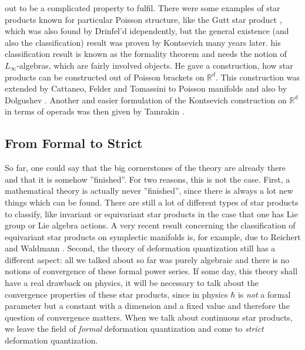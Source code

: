out to be a complicated property to fulfil. There were some examples of star 
products known for particular Poisson structure, like the Gutt star product 
\cite{gutt:1983a}, which was also found by Drinfel'd \cite{drinfeld:1983a} 
idependently, but the general existence (and also the classification) result was 
proven by Kontsevich \cite{kontsevich:1997:pre, kontsevich:2003a} many years 
later. his classification result is known as the formality theorem and needs the 
notion of $L_{\infty}$-algebras, which are fairly involved objects. He gave a 
construction, how star products can be constructed out of Poisson brackets on 
$\mathbb{R}^d$. This construction was extended by Cattaneo, Felder and Tomassini 
to Poisson manifolds \cite{cattaneo.felder.tomassini:2002b} and also by 
Dolgushev \cite{dolgushev:2005a}. Another and easier formulation of the 
Kontsevich construction on $\mathbb{R}^d$ in terms of operads was then given by 
Tamrakin \cite{tamarkin:2003a}.



\subsection{From Formal to Strict}
\label{subsec:chap2_Formal2Strict}

So far, one could say that the big cornerstones of the theory are already there 
and that it is somehow ''finished''. For two reasons, this is not the case. 
First, a mathematical theory is actually never ''finished'', since there is 
always a lot new things which can be found. There are still a lot of different 
types of star products to classify, like invariant or equivariant star products 
in the case that one has Lie group or Lie algebra actions. A very recent result 
concerning the classification of equivariant star products on symplectic 
manifolds is, for example, due to Reichert and Waldmann 
\cite{reichert.waldmann:2015a:pre}. Second, the theory of deformation 
quantization still has a different aspect: all we talked about so far was purely 
algebraic and there is no notions of convergence of these formal power series. 
If some day, this theory shall have a real drawback on physics, it will be 
necessary to talk about the convergence properties of these star products, since 
in physics $\hbar$ is \emph{not} a formal parameter but a constant with a 
dimension and a fixed value and therefore the question of convergence matters. 
When we talk about continuous star products, we leave the field of \emph{formal} 
deformation quantization and come to \emph{strict} deformation quantization.


